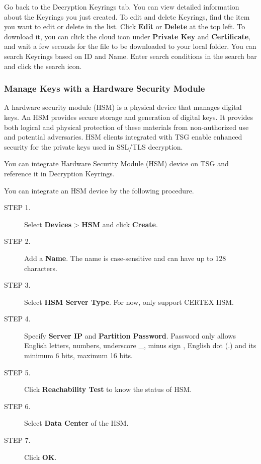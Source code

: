 Go back to the Decryption Keyrings tab. You can view detailed information about the Keyrings you just created. 
To edit and delete Keyrings, find the item you want to edit or delete in the list. Click \textbf{Edit} or \textbf{Delete} at the top left. 
To download it, you can click the cloud icon under \textbf{Private Key} and \textbf{Certificate}, and wait a few seconds for the file to be downloaded to your local folder. 
You can search Keyrings based on ID and Name. Enter search conditions in the search bar and click the search icon.

\subsubsection*{\hypertarget{link:Manage Keys with a Hardware Security Module}{Manage Keys with a Hardware Security Module}}
\label{sec:decrypt:certificate:keyring:hsm}

A hardware security module (HSM) is a physical device that manages digital keys. An HSM provides secure storage and generation of digital keys. 
It provides both logical and physical protection of these materials from non-authorized use and potential adversaries. 
HSM clients integrated with TSG enable enhanced security for the private keys used in SSL/TLS decryption.


You can integrate Hardware Security Module (HSM) device on TSG and reference it in Decryption Keyrings.


You can integrate an HSM device by the following procedure. 

\begin{description}
    \item[STEP 1.]	Select \textbf{Devices} > \textbf{HSM} and click \textbf{Create}.
    \item[STEP 2.]	Add a \textbf{Name}. The name is case-sensitive and can have up to 128 characters.
    \item[STEP 3.]	Select \textbf{HSM Server Type}. For now, only support CERTEX HSM.
    \item[STEP 4.]	Specify \textbf{Server IP} and \textbf{Partition Password}. Password only allows English letters, numbers, underscore \_, minus sign \-, English dot (.) 
    and its minimum 6 bits, maximum 16 bits.
    \item[STEP 5.]	Click \textbf{Reachability Test} to know the status of HSM.
    \item[STEP 6.]	Select \textbf{Data Center} of the HSM.
    \item[STEP 7.]	Click \textbf{OK}.
\end{description}

